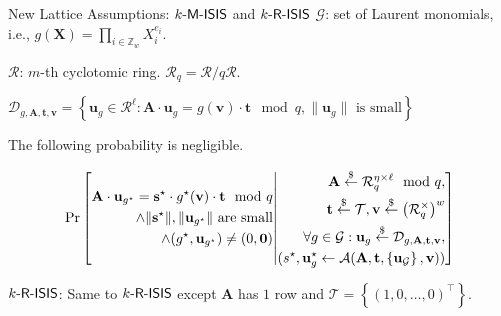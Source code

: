 \begin{frame}{New Lattice Assumptions: $k\textsf{-M-ISIS}$ and $k\textsf{-R-ISIS}$}
	$\mathcal{G}$: set of Laurent monomials, i.e., $g(\mathbf{X}) = \prod_{i\in \mathbb{Z}_w}X_i^{e_i}$.
	
	$\mathcal{R}$: $m$-th cyclotomic ring. $\mathcal{R}_q = \mathcal{R}/q\mathcal{R}$.
	
	$\mathcal{D}_{g, \mathbf{A}, \mathbf{t}, \mathbf{v}} = \left\{\mathbf{u}_g\in\mathcal{R}^\ell : \mathbf{A}\cdot \mathbf{u}_g = g(\mathbf{v})\cdot\mathbf{t} \mod q, \lVert\mathbf{u}_g\rVert \text{ is small}\right\}$
	
	The following probability is negligible.
	
	\begin{equation*}
		\Pr\left[
		\begin{split}
			\mathbf{A}\cdot\mathbf{u}_{g^\star} = \mathbf{s}^\star \cdot g^\star(\mathbf{v})\cdot \mathbf{t}\mod q \\
			\wedge \text{$\lVert\mathbf{s}^\star\rVert, \lVert\mathbf{u}_{g^\star}\rVert$ are small}\\
			\wedge (g^\star, \mathbf{u}_{g^\star}) \not= (0, \mathbf{0})
		\end{split}
		\middle|
		\begin{split}
			\mathbf{A} \stackrel{\$}{\leftarrow} \mathcal{R}_q^{\eta\times \ell} \mod q,\\
			\mathbf{t}\stackrel{\$}{\leftarrow}\mathcal{T}, \mathbf{v}\stackrel{\$}{\leftarrow} \left(\mathcal{R}_q^\times \right)^w\\
			\forall g \in \mathcal{G}:\mathbf{u}_g \stackrel{\$}{\leftarrow}\mathcal{D}_{g, \mathbf{A}, \mathbf{t}, \mathbf{v}},\\
			(s^\star, \mathbf{u}_g^{\star} \leftarrow \mathcal{A}(\mathbf{A}, \mathbf{t}, \left\{\mathbf{u}_\mathcal{G}\right\}, \mathbf{v}))
		\end{split}
		\right]
	\end{equation*}

	$k\textsf{-R-ISIS}$: Same to $k\textsf{-R-ISIS}$ except $\mathbf{A}$ has $1$ row and $\mathcal{T} = \left\{(1, 0, \dots, 0)^\top\right\}$.
\end{frame}